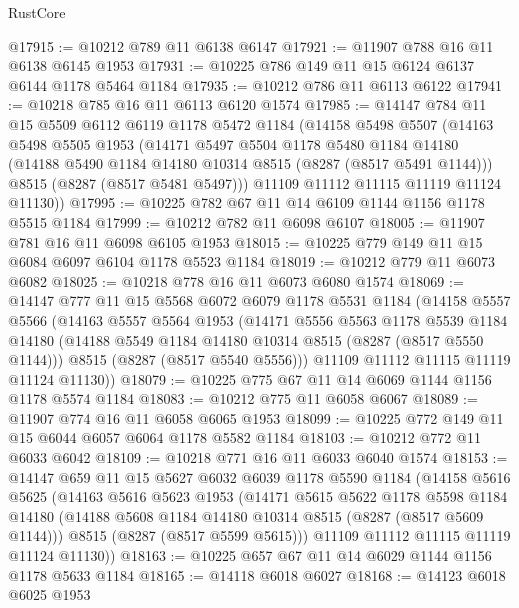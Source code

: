 \begin{lexlean}{RustCore}
\begin{coremodule}
@17915 := @10212 @789 @11 @6138 @6147
@17921 := @11907 @788 @16 @11 @6138 @6145 @1953
@17931 := @10225 @786 @149 @11 @15 @6124 @6137 @6144 @1178 @5464 @1184
@17935 := @10212 @786 @11 @6113 @6122
@17941 := @10218 @785 @16 @11 @6113 @6120 @1574
@17985 := @14147
    @784
    @11
    @15
    @5509
    @6112
    @6119
    @1178
    @5472
    @1184
    (@14158
      @5498
      @5507
      (@14163
        @5498
        @5505
        @1953
        (@14171
          @5497
          @5504
          @1178
          @5480
          @1184
          @14180
          (@14188 @5490 @1184 @14180 @10314 @8515 (@8287 (@8517 @5491 @1144)))
          @8515
          (@8287 (@8517 @5481 @5497)))
        @11109
        @11112
        @11115
        @11119
        @11124
        @11130))
@17995 := @10225 @782 @67 @11 @14 @6109 @1144 @1156 @1178 @5515 @1184
@17999 := @10212 @782 @11 @6098 @6107
@18005 := @11907 @781 @16 @11 @6098 @6105 @1953
@18015 := @10225 @779 @149 @11 @15 @6084 @6097 @6104 @1178 @5523 @1184
@18019 := @10212 @779 @11 @6073 @6082
@18025 := @10218 @778 @16 @11 @6073 @6080 @1574
@18069 := @14147
    @777
    @11
    @15
    @5568
    @6072
    @6079
    @1178
    @5531
    @1184
    (@14158
      @5557
      @5566
      (@14163
        @5557
        @5564
        @1953
        (@14171
          @5556
          @5563
          @1178
          @5539
          @1184
          @14180
          (@14188 @5549 @1184 @14180 @10314 @8515 (@8287 (@8517 @5550 @1144)))
          @8515
          (@8287 (@8517 @5540 @5556)))
        @11109
        @11112
        @11115
        @11119
        @11124
        @11130))
@18079 := @10225 @775 @67 @11 @14 @6069 @1144 @1156 @1178 @5574 @1184
@18083 := @10212 @775 @11 @6058 @6067
@18089 := @11907 @774 @16 @11 @6058 @6065 @1953
@18099 := @10225 @772 @149 @11 @15 @6044 @6057 @6064 @1178 @5582 @1184
@18103 := @10212 @772 @11 @6033 @6042
@18109 := @10218 @771 @16 @11 @6033 @6040 @1574
@18153 := @14147
    @659
    @11
    @15
    @5627
    @6032
    @6039
    @1178
    @5590
    @1184
    (@14158
      @5616
      @5625
      (@14163
        @5616
        @5623
        @1953
        (@14171
          @5615
          @5622
          @1178
          @5598
          @1184
          @14180
          (@14188 @5608 @1184 @14180 @10314 @8515 (@8287 (@8517 @5609 @1144)))
          @8515
          (@8287 (@8517 @5599 @5615)))
        @11109
        @11112
        @11115
        @11119
        @11124
        @11130))
@18163 := @10225 @657 @67 @11 @14 @6029 @1144 @1156 @1178 @5633 @1184
@18165 := @14118 @6018 @6027
@18168 := @14123 @6018 @6025 @1953

\end{coremodule}
\end{lexlean}
